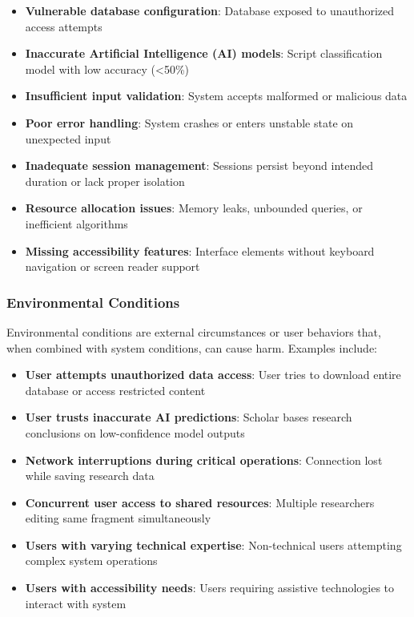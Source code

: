 \documentclass{article}
\begin{document}
\begin{itemize}
\item \textbf{Vulnerable database configuration}: Database exposed to unauthorized access attempts
\item \textbf{Inaccurate Artificial Intelligence (AI) models}: Script classification model with low accuracy (<50\%)
\item \textbf{Insufficient input validation}: System accepts malformed or malicious data
\item \textbf{Poor error handling}: System crashes or enters unstable state on unexpected input
\item \textbf{Inadequate session management}: Sessions persist beyond intended duration or lack proper isolation
\item \textbf{Resource allocation issues}: Memory leaks, unbounded queries, or inefficient algorithms
\item \textbf{Missing accessibility features}: Interface elements without keyboard navigation or screen reader support
\end{itemize}

\subsubsection{Environmental Conditions}

Environmental conditions are external circumstances or user behaviors that, when combined with system conditions, can cause harm. Examples include:

\begin{itemize}
\item \textbf{User attempts unauthorized data access}: User tries to download entire database or access restricted content
\item \textbf{User trusts inaccurate AI predictions}: Scholar bases research conclusions on low-confidence model outputs
\item \textbf{Network interruptions during critical operations}: Connection lost while saving research data
\item \textbf{Concurrent user access to shared resources}: Multiple researchers editing same fragment simultaneously
\item \textbf{Users with varying technical expertise}: Non-technical users attempting complex system operations
\item \textbf{Users with accessibility needs}: Users requiring assistive technologies to interact with system
\end{itemize}
\end{document}
